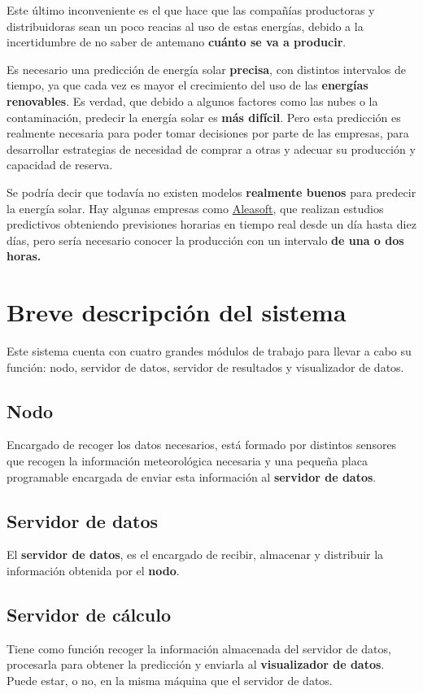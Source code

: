 Este último inconveniente es el que hace que las compañías productoras y distribuidoras sean un poco reacias al uso de estas energías, debido a la incertidumbre de no saber de antemano \textbf{cuánto se va a producir}.

Es necesario una predicción de energía solar \textbf{precisa}, con distintos intervalos de tiempo, ya que cada vez es mayor el crecimiento del uso de las \textbf{energías renovables}. 
Es verdad, que debido a algunos factores como las nubes o la contaminación, predecir la energía solar es \textbf{más difícil}.
Pero esta predicción es realmente necesaria para poder tomar decisiones por parte de las empresas, para desarrollar estrategias de necesidad de comprar a otras y adecuar su producción y capacidad de reserva.

Se podría decir que todavía no existen modelos \textbf{realmente buenos} para predecir la energía solar. Hay algunas empresas como \href{https://aleasoft.com/es/}{Aleasoft}, que realizan estudios predictivos obteniendo previsiones horarias en tiempo real desde un día hasta diez días, pero sería necesario conocer la producción con un intervalo \textbf{de una o dos horas.}

\section{Breve descripción del sistema}
\label{makereference1.2}

Este sistema cuenta con cuatro grandes módulos de trabajo para llevar a cabo su función: nodo, servidor de datos, servidor de resultados y visualizador de datos.

\subsection{Nodo}
\label{makereference1.2.1}
Encargado de recoger los datos necesarios, está formado por distintos sensores que recogen la información meteorológica necesaria y una pequeña placa programable encargada de enviar esta información al \textbf{servidor de datos}.

\subsection{Servidor de datos}
\label{makereference1.2.2}
El \textbf{servidor de datos}, es el encargado de recibir, almacenar y distribuir la información obtenida por el \textbf{nodo}.

\subsection{Servidor de cálculo}
\label{makereference1.2.3}
Tiene como función recoger la información almacenada del servidor de datos, procesarla para obtener la predicción y enviarla al \textbf{visualizador de datos}. Puede estar, o no, en la misma máquina que el servidor de datos.

